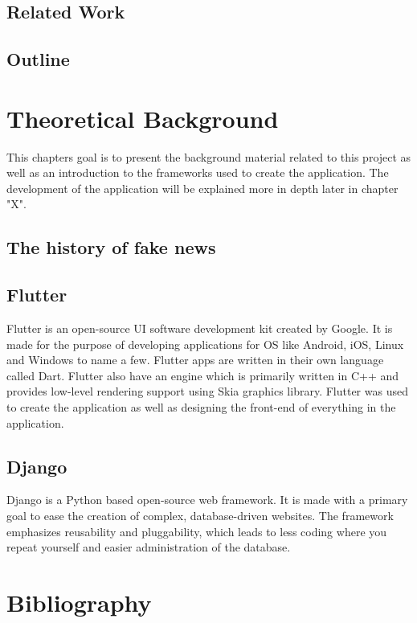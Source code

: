 \documentclass[12pt, letterpaper, twoside]{article}
\begin{document}
\subsection{Related Work}
\subsection{Outline}

\section{Theoretical Background}
This chapters goal is to present the background material related to this project as well as an introduction to the frameworks used to create the application. The development of the application will be explained more in depth later in chapter "X". 
\subsection{The history of fake news}
\subsection{Flutter}
Flutter is an open-source UI software development kit created by Google. It is made for the purpose of developing applications for OS like Android, iOS, Linux and Windows to name a few. Flutter apps are written in their own language called Dart. Flutter also have an engine which is primarily written in C++ and provides low-level rendering support using Skia graphics library. Flutter was used to create the application as well as designing the front-end of everything in the application. \\
\subsection{Django}
Django is a Python based open-source web framework. It is made with a primary goal to ease the creation of complex, database-driven websites. The framework emphasizes reusability and pluggability, which leads to less coding where you repeat yourself and easier administration of the database. 
\section{Bibliography}
\end{document}
